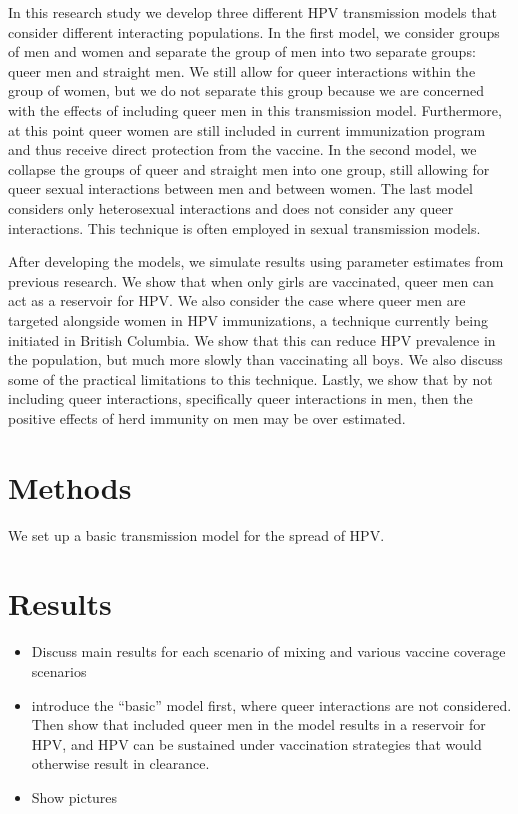 \documentclass[12pt]{article}
\begin{document}
In this research study we develop three different HPV transmission models that consider different interacting populations.  In the first model, we consider groups of men and women and separate the group of men into two separate groups: queer men and straight men.  We still allow for queer interactions within the group of women, but we do not separate this group because we are concerned with the effects of including queer men in this transmission model.  Furthermore, at this point queer women are still included in current immunization program and thus receive direct protection from the vaccine. In the second model, we collapse the groups of queer and straight men into one group, still allowing for queer sexual interactions between men and between women.  The last model considers only heterosexual interactions and does not consider any queer interactions.  This technique is often employed in sexual transmission models.

After developing the models, we simulate results using parameter estimates from previous research.  We show that when only girls are vaccinated, queer men can act as a reservoir for HPV.  We also consider the case where queer men are targeted alongside women in HPV immunizations, a technique currently being initiated in British Columbia.  We show that this can reduce HPV prevalence in the population, but much more slowly than vaccinating all boys.  We also discuss some of the practical limitations to this technique.  Lastly, we show that by not including queer interactions, specifically queer interactions in men, then the positive effects of herd immunity on men may be over estimated. 

\section{Methods}
We set up a basic transmission model for the spread of HPV.  



\section{Results}
\begin{itemize}
\item Discuss main results for each scenario of mixing and various vaccine coverage scenarios
\item introduce the ``basic'' model first, where queer interactions are not considered.  Then show that included queer men in the model results in a reservoir for HPV, and HPV can be sustained under vaccination strategies that would otherwise result in clearance. 
\item Show pictures
\end{itemize}
\end{document}
